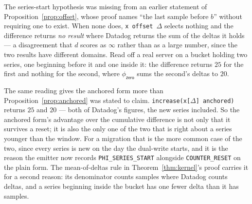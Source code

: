 \begin{remark}\label{rem:series-start}
The series-start hypothesis was missing from an earlier statement of
Proposition~\ref{prop:offset}, whose proof names ``the last sample before $b$'' without
requiring one to exist. When none does, \texttt{x offset $\Delta$} selects nothing and
the difference returns \emph{no result} where Datadog returns the sum of the deltas it
holds --- a disagreement that $d$ scores as $\infty$ rather than as a large number,
since the two results have different domains. Read off a real server on a bucket holding
two series, one beginning before it and one inside it: the difference returns $25$ for
the first and nothing for the second, where $\phi_{\mathsf{zero}}$ sums the second's
deltas to $20$.

The same reading gives the anchored form more than Proposition~\ref{prop:anchored} was
stated to claim. \texttt{increase(x[$\Delta$] anchored)} returns $25$ and $20$ --- both
of Datadog's figures, the new series included. So the anchored form's advantage over the
cumulative difference is not only that it survives a reset; it is also the only one of
the two that is right about a series younger than the window. For a migration that is
the more common case of the two, since every series is new on the day the dual-write
starts, and it is the reason the emitter now records \texttt{PHI\_SERIES\_START}
alongside \texttt{COUNTER\_RESET} on the plain form. The mean-of-deltas rule in Theorem~\ref{thm:kernel}'s proof carries it for a second reason: its denominator counts samples
where Datadog counts deltas, and a series beginning inside the bucket has one fewer
delta than it has samples.
\end{remark}
